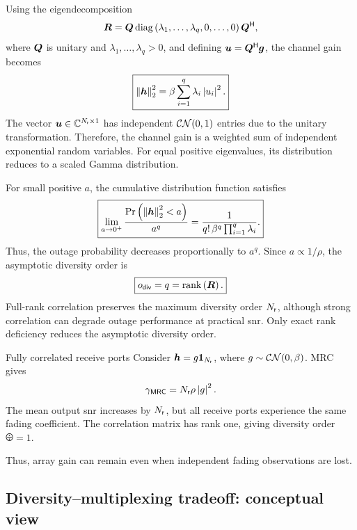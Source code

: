 Using the eigendecomposition
\begin{equation*}
	\bm{R}=\bm{Q}\operatorname{diag}\left(\lambda_1,\ldots,\lambda_q,0,\ldots,0\right){\bm{Q}}^{\mathsf{H}},
\end{equation*}
where $\bm{Q}$ is unitary and $\lambda_1,\ldots,\lambda_q>0$, and defining $\bm{u}={\bm{Q}}^{\mathsf{H}}\bm{g}$, the channel gain becomes
\begin{equation}\label{eq:corrgain}
	\boxed{
		\left\|\bm{h}\right\|_2^2
		=\beta\sum_{i=1}^{q}\lambda_i\left|u_i\right|^2.
	}
\end{equation}
The vector $\bm{u}\in\mathbb{C}^{N_{\mathsf{r}}\times1}$ has independent $\mathcal{CN}(0,1)$ entries due to the unitary transformation. Therefore, the channel gain is a weighted sum of independent exponential random variables. For equal positive eigenvalues, its distribution reduces to a scaled Gamma distribution.

For small positive $a$, the cumulative distribution function satisfies
\begin{equation}\label{eq:corrtail}
	\boxed{
		\lim_{a\to0^+}
		\frac{\Pr\left(\left\|\bm{h}\right\|_2^2<a\right)}{a^q}
		=
		\frac{1}{q!\,\beta^q\prod_{i=1}^{q}\lambda_i}.
	}
\end{equation}
Thus, the outage probability decreases proportionally to $a^q$. Since $a\propto1/\rho$, the asymptotic diversity order is
\begin{equation*}
	\boxed{o_{\mathsf{div}}=q=\operatorname{rank}\left(\bm{R}\right).}
\end{equation*}
Full-rank correlation preserves the maximum diversity order $N_{\mathsf{r}}$, although strong correlation can degrade outage performance at practical \ac{snr}. Only exact rank deficiency reduces the asymptotic diversity order.

\begin{example}{Fully correlated receive ports}
	Consider $\bm{h}=g\bm{1}_{N_{\mathsf{r}}}$, where $g\sim\mathcal{CN}(0,\beta)$. MRC gives
	\begin{equation*}
		\gamma_{\mathsf{MRC}}
		=N_{\mathsf{r}}\rho\left|g\right|^2.
	\end{equation*}
	The mean output \ac{snr} increases by $N_{\mathsf{r}}$, but all receive ports experience the same fading coefficient. The correlation matrix has rank one, giving diversity order $\odiv=1$.
	
	Thus, array gain can remain even when independent fading observations are lost.
\end{example}


\subsection{Diversity--multiplexing tradeoff: conceptual view}

